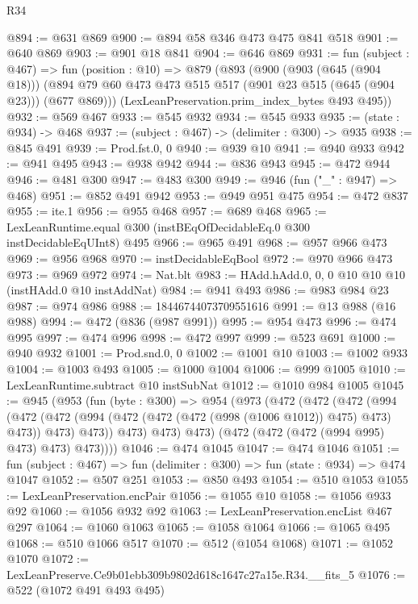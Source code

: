 \begin{lexlean}{R34}
\begin{coremodule}
@894 := @631 @869
@900 := @894 @58 @346 @473 @475 @841 @518
@901 := @640 @869
@903 := @901 @18 @841
@904 := @646 @869
@931 := fun (subject : @467) =>
  fun (position : @10) =>
  @879
    (@893
      (@900
        (@903 (@645 (@904 @18)))
        (@894 @79 @60 @473 @473 @515 @517 (@901 @23 @515 (@645 (@904 @23))) (@677 @869)))
      (LexLeanPreservation.prim_index_bytes @493 @495))
@932 := @569 @467
@933 := @545 @932
@934 := @545 @933
@935 := (state : @934) -> @468
@937 := (subject : @467) -> (delimiter : @300) -> @935
@938 := @845 @491
@939 := Prod.fst.{0, 0}
@940 := @939 @10
@941 := @940 @933
@942 := @941 @495
@943 := @938 @942
@944 := @836 @943
@945 := @472 @944
@946 := @481 @300
@947 := @483 @300
@949 := @946 (fun ("_" : @947) => @468)
@951 := @852 @491 @942
@953 := @949 @951 @475
@954 := @472 @837
@955 := ite.{1}
@956 := @955 @468
@957 := @689 @468
@965 := LexLeanRuntime.equal @300 (instBEqOfDecidableEq.{0} @300 instDecidableEqUInt8) @495
@966 := @965 @491
@968 := @957 @966 @473
@969 := @956 @968
@970 := instDecidableEqBool
@972 := @970 @966 @473
@973 := @969 @972
@974 := Nat.blt
@983 := HAdd.hAdd.{0, 0, 0} @10 @10 @10 (instHAdd.{0} @10 instAddNat)
@984 := @941 @493
@986 := @983 @984 @23
@987 := @974 @986
@988 := 18446744073709551616
@991 := @13 @988 (@16 @988)
@994 := @472 (@836 (@987 @991))
@995 := @954 @473
@996 := @474 @995
@997 := @474 @996
@998 := @472 @997
@999 := @523 @691
@1000 := @940 @932
@1001 := Prod.snd.{0, 0}
@1002 := @1001 @10
@1003 := @1002 @933
@1004 := @1003 @493
@1005 := @1000 @1004
@1006 := @999 @1005
@1010 := LexLeanRuntime.subtract @10 instSubNat
@1012 := @1010 @984 @1005
@1045 := @945
    (@953
      (fun (byte : @300) =>
      @954
        (@973
          (@472
            (@472
              (@472
                (@994
                  (@472
                    (@472 (@994 (@472 (@472 (@472 (@998 (@1006 @1012)) @475) @473) @473)) @473)
                    @473))
                @473)
              @473)
            @473)
          (@472 (@472 (@472 (@994 @995) @473) @473) @473))))
@1046 := @474 @1045
@1047 := @474 @1046
@1051 := fun (subject : @467) => fun (delimiter : @300) => fun (state : @934) => @474 @1047
@1052 := @507 @251
@1053 := @850 @493
@1054 := @510 @1053
@1055 := LexLeanPreservation.encPair
@1056 := @1055 @10
@1058 := @1056 @933 @92
@1060 := @1056 @932 @92
@1063 := LexLeanPreservation.encList @467 @297
@1064 := @1060 @1063
@1065 := @1058 @1064
@1066 := @1065 @495
@1068 := @510 @1066 @517
@1070 := @512 (@1054 @1068)
@1071 := @1052 @1070
@1072 := LexLeanPreserve.Ce9b01ebb309b9802d618c1647c27a15e.R34.__fits_5
@1076 := @522 (@1072 @491 @493 @495)

\end{coremodule}
\end{lexlean}
